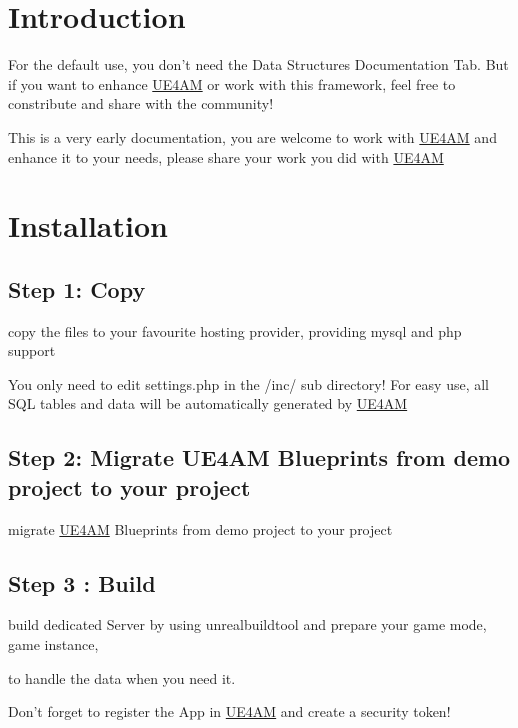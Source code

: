\hypertarget{index_intro_sec}{}\section{Introduction}\label{index_intro_sec}
For the default use, you don't need the Data Structures Documentation Tab. But if you want to enhance \hyperlink{class_u_e4_a_m}{U\-E4\-A\-M} or work with this framework, feel free to constribute and share with the community!

This is a very early documentation, you are welcome to work with \hyperlink{class_u_e4_a_m}{U\-E4\-A\-M} and enhance it to your needs, please share your work you did with \hyperlink{class_u_e4_a_m}{U\-E4\-A\-M}\hypertarget{index_install_sec}{}\section{Installation}\label{index_install_sec}
\hypertarget{index_step1}{}\subsection{Step 1\-: Copy}\label{index_step1}
copy the files to your favourite hosting provider, providing mysql and php support

You only need to edit settings.\-php in the /inc/ sub directory! For easy use, all S\-Q\-L tables and data will be automatically generated by \hyperlink{class_u_e4_a_m}{U\-E4\-A\-M}\hypertarget{index_step2}{}\subsection{Step 2\-: Migrate U\-E4\-A\-M Blueprints from demo project to your project}\label{index_step2}
migrate \hyperlink{class_u_e4_a_m}{U\-E4\-A\-M} Blueprints from demo project to your project \hypertarget{index_step3}{}\subsection{Step 3 \-: Build}\label{index_step3}
build dedicated Server by using unrealbuildtool and prepare your game mode, game instance,

to handle the data when you need it.

Don't forget to register the App in \hyperlink{class_u_e4_a_m}{U\-E4\-A\-M} and create a security token! 